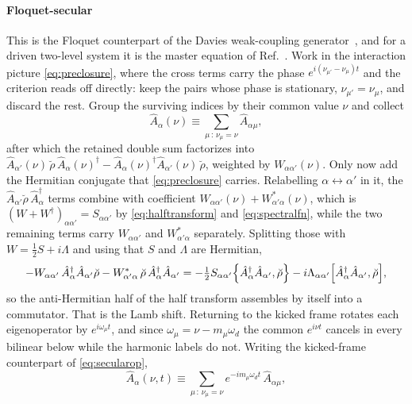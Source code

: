 \documentclass[a4paper,11pt]{article}
\begin{document}
\paragraph{Floquet-secular}
This is the Floquet counterpart of the Davies weak-coupling generator~\cite{Davies1974,Davies1976}, and for a driven two-level system it is the master equation of Ref.~\cite{Szczygielski2013Markovian}. Work in the interaction picture \eqref{eq:preclosure}, where the cross terms carry the phase $e^{i(\nu_{\mu'}-\nu_\mu)t}$ and the criterion reads off directly: keep the pairs whose phase is stationary, $\nu_{\mu'}=\nu_\mu$, and discard the rest. Group the surviving indices by their common value $\nu$ and collect
\begin{equation}\label{eq:secularop}
  \hat A_\alpha(\nu) \equiv \sum_{\mu\,:\,\nu_\mu = \nu}\hat A_{\alpha\mu},
\end{equation}
after which the retained double sum factorizes into $\hat A_{\alpha'}(\nu)\,\breve\rho\,\hat A_\alpha(\nu)^\dagger - \hat A_\alpha(\nu)^\dagger\hat A_{\alpha'}(\nu)\,\breve\rho$, weighted by $W_{\alpha\alpha'}(\nu)$. Only now add the Hermitian conjugate that \eqref{eq:preclosure} carries. Relabelling $\alpha\leftrightarrow\alpha'$ in it, the $\hat A_{\alpha'}\breve\rho\,\hat A_\alpha^\dagger$ terms combine with coefficient $W_{\alpha\alpha'}(\nu) + W^*_{\alpha'\alpha}(\nu)$, which is $(W+W^\dagger)_{\alpha\alpha'} = S_{\alpha\alpha'}$ by \eqref{eq:halftransform} and \eqref{eq:spectralfn}, while the two remaining terms carry $W_{\alpha\alpha'}$ and $W^*_{\alpha'\alpha}$ separately. Splitting those with $W = \tfrac12 S + i\Lambda$ and using that $S$ and $\Lambda$ are Hermitian,
\begin{equation}\label{eq:secularsplit}
  -W_{\alpha\alpha'}\,\hat A_\alpha^\dagger \hat A_{\alpha'}\breve\rho
  - W^*_{\alpha'\alpha}\,\breve\rho\,\hat A_\alpha^\dagger \hat A_{\alpha'}
  = -\tfrac12 S_{\alpha\alpha'}\acomm{\hat A_\alpha^\dagger \hat A_{\alpha'}}{\breve\rho}
  - i\Lambda_{\alpha\alpha'}\comm{\hat A_\alpha^\dagger \hat A_{\alpha'}}{\breve\rho},
\end{equation}
so the anti-Hermitian half of the half transform assembles by itself into a commutator. That is the Lamb shift. Returning to the kicked frame rotates each eigenoperator by $e^{i\omega_\mu t}$, and since $\omega_\mu = \nu - m_\mu\omega_d$ the common $e^{i\nu t}$ cancels in every bilinear below while the harmonic labels do not. Writing the kicked-frame counterpart of \eqref{eq:secularop},
\begin{equation}\label{eq:secularop-kicked}
  \hat A_\alpha(\nu,t) \equiv \sum_{\mu\,:\,\nu_\mu = \nu}e^{-i m_\mu\omega_d t}\,\hat A_{\alpha\mu},
\end{equation}
\end{document}
